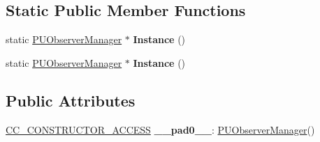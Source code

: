 \subsection*{Static Public Member Functions}
\begin{DoxyCompactItemize}
\item 
\mbox{\label{classPUObserverManager_a7f42d1895f01d1c8933135a44279ce61}} 
static \hyperlink{classPUObserverManager}{P\+U\+Observer\+Manager} $\ast$ {\bfseries Instance} ()
\item 
\mbox{\label{classPUObserverManager_ace886110ebb943e2db4e8d618a34bdf2}} 
static \hyperlink{classPUObserverManager}{P\+U\+Observer\+Manager} $\ast$ {\bfseries Instance} ()
\end{DoxyCompactItemize}
\subsection*{Public Attributes}
\begin{DoxyCompactItemize}
\item 
\mbox{\label{classPUObserverManager_a68e10dcb255963681b786871788eaf61}} 
\hyperlink{_2cocos2d_2cocos_2base_2ccConfig_8h_a25ef1314f97c35a2ed3d029b0ead6da0}{C\+C\+\_\+\+C\+O\+N\+S\+T\+R\+U\+C\+T\+O\+R\+\_\+\+A\+C\+C\+E\+SS} {\bfseries \+\_\+\+\_\+pad0\+\_\+\+\_\+}\+: \hyperlink{classPUObserverManager}{P\+U\+Observer\+Manager}()
\end{DoxyCompactItemize}
